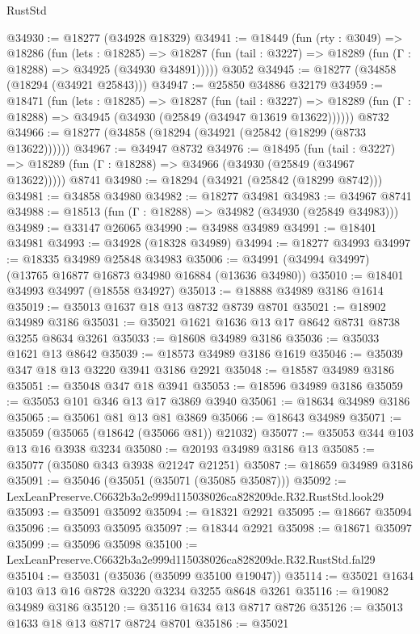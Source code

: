 \begin{lexlean}{RustStd}
\begin{coremodule}
@34930 := @18277 (@34928 @18329)
@34941 := @18449
    (fun (rty : @3049) =>
    @18286
      (fun (lets : @18285) =>
      @18287 (fun (tail : @3227) => @18289 (fun (Γ : @18288) => @34925 (@34930 @34891)))))
    @3052
@34945 := @18277 (@34858 (@18294 (@34921 @25843)))
@34947 := @25850 @34886 @32179
@34959 := @18471
    (fun (lets : @18285) =>
    @18287
      (fun (tail : @3227) =>
      @18289 (fun (Γ : @18288) => @34945 (@34930 (@25849 (@34947 @13619 @13622))))))
    @8732
@34966 := @18277 (@34858 (@18294 (@34921 (@25842 (@18299 (@8733 @13622))))))
@34967 := @34947 @8732
@34976 := @18495
    (fun (tail : @3227) => @18289 (fun (Γ : @18288) => @34966 (@34930 (@25849 (@34967 @13622)))))
    @8741
@34980 := @18294 (@34921 (@25842 (@18299 @8742)))
@34981 := @34858 @34980
@34982 := @18277 @34981
@34983 := @34967 @8741
@34988 := @18513 (fun (Γ : @18288) => @34982 (@34930 (@25849 @34983)))
@34989 := @33147 @26065
@34990 := @34988 @34989
@34991 := @18401 @34981
@34993 := @34928 (@18328 @34989)
@34994 := @18277 @34993
@34997 := @18335 @34989 @25848 @34983
@35006 := @34991 (@34994 @34997) (@13765 @16877 @16873 @34980 @16884 (@13636 @34980))
@35010 := @18401 @34993 @34997 (@18558 @34927)
@35013 := @18888 @34989 @3186 @1614
@35019 := @35013 @1637 @18 @13 @8732 @8739 @8701
@35021 := @18902 @34989 @3186
@35031 := @35021 @1621 @1636 @13 @17 @8642 @8731 @8738 @3255 @8634 @3261
@35033 := @18608 @34989 @3186
@35036 := @35033 @1621 @13 @8642
@35039 := @18573 @34989 @3186 @1619
@35046 := @35039 @347 @18 @13 @3220 @3941 @3186 @2921
@35048 := @18587 @34989 @3186
@35051 := @35048 @347 @18 @3941
@35053 := @18596 @34989 @3186
@35059 := @35053 @101 @346 @13 @17 @3869 @3940
@35061 := @18634 @34989 @3186
@35065 := @35061 @81 @13 @81 @3869
@35066 := @18643 @34989
@35071 := @35059 (@35065 (@18642 (@35066 @81)) @21032)
@35077 := @35053 @344 @103 @13 @16 @3938 @3234
@35080 := @20193 @34989 @3186 @13
@35085 := @35077 (@35080 @343 @3938 @21247 @21251)
@35087 := @18659 @34989 @3186
@35091 := @35046 (@35051 (@35071 (@35085 @35087)))
@35092 := LexLeanPreserve.C6632b3a2e999d115038026ca828209de.R32.RustStd.look29
@35093 := @35091 @35092
@35094 := @18321 @2921
@35095 := @18667 @35094
@35096 := @35093 @35095
@35097 := @18344 @2921
@35098 := @18671 @35097
@35099 := @35096 @35098
@35100 := LexLeanPreserve.C6632b3a2e999d115038026ca828209de.R32.RustStd.fal29
@35104 := @35031 (@35036 (@35099 @35100 @19047))
@35114 := @35021 @1634 @103 @13 @16 @8728 @3220 @3234 @3255 @8648 @3261
@35116 := @19082 @34989 @3186
@35120 := @35116 @1634 @13 @8717 @8726
@35126 := @35013 @1633 @18 @13 @8717 @8724 @8701
@35186 := @35021

\end{coremodule}
\end{lexlean}
